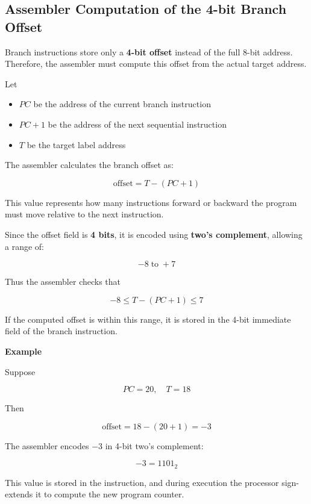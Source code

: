 \documentclass{article}
\begin{document}
\subsection*{Assembler Computation of the 4-bit Branch Offset}

Branch instructions store only a \textbf{4-bit offset} instead of the full 
8-bit address. Therefore, the assembler must compute this offset from the 
actual target address.

Let
\begin{itemize}
    \item $PC$ be the address of the current branch instruction
    \item $PC+1$ be the address of the next sequential instruction
    \item $T$ be the target label address
\end{itemize}

The assembler calculates the branch offset as:

\[
\text{offset} = T - (PC + 1)
\]

This value represents how many instructions forward or backward the program 
must move relative to the next instruction.

Since the offset field is \textbf{4 bits}, it is encoded using 
\textbf{two's complement}, allowing a range of:

\[
-8 \; \text{to} \; +7
\]

Thus the assembler checks that

\[
-8 \leq T - (PC + 1) \leq 7
\]

If the computed offset is within this range, it is stored in the 4-bit 
immediate field of the branch instruction.

\bigskip

\textbf{Example}

Suppose

\[
PC = 20, \quad T = 18
\]

Then

\[
\text{offset} = 18 - (20 + 1) = -3
\]

The assembler encodes $-3$ in 4-bit two's complement:

\[
-3 = 1101_2
\]

This value is stored in the instruction, and during execution the processor 
sign-extends it to compute the new program counter.
\end{document}
